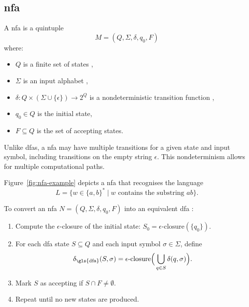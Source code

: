 \subsection{\acrfull{nfa}}
\label{subsec:nfa}
\begin{definition}
    A \gls{nfa} is a quintuple 
    \[
    M = (Q, \Sigma, \delta, q_0, F)
    \]
    where:
    \begin{itemize}
        \item \( Q \) is a finite set of states \cite{kozen1997automata},
        \item \( \Sigma \) is an input alphabet \cite{sudkamp2006languages},
        \item \( \delta: Q \times (\Sigma \cup \{\epsilon\}) \rightarrow 2^Q \) is a nondeterministic transition function \cite{hopcroft2006introduction},
        \item \( q_0 \in Q \) is the initial state,
        \item \( F \subseteq Q \) is the set of accepting states.
    \end{itemize}
\end{definition}

\begin{remark}
Unlike \glspl{dfa}, a \gls{nfa} may have multiple transitions for a given state and input symbol, including transitions on the empty string \(\epsilon\). This nondeterminism allows for multiple computational paths.
\end{remark}

\begin{example}
Figure~\ref{fig:nfa-example} depicts a \gls{nfa} that recognises the language 
\[
L = \{ w \in \{a,b\}^* \mid w \text{ contains the substring } ab \}.
\]
\end{example}

\begin{algorithm}
\label{alg:subset}
To convert an \gls{nfa} \( N = (Q, \Sigma, \delta, q_0, F) \) into an equivalent \gls{dfa} \cite{hopcroft2006introduction, kozen1997automata}:
\begin{enumerate}
    \item Compute the \(\epsilon\)-closure of the initial state: \( S_0 = \epsilon\text{-closure}(\{q_0\}) \).
    \item For each \gls{dfa} state \( S \subseteq Q \) and each input symbol \(\sigma \in \Sigma\), define 
    \[
    \delta_{\text{\gls{dfa}}}(S, \sigma) = \epsilon\text{-closure}\Big(\bigcup_{q \in S} \delta(q, \sigma)\Big).
    \]
    \item Mark \( S \) as accepting if \( S \cap F \neq \emptyset \).
    \item Repeat until no new states are produced.
\end{enumerate}
\end{algorithm}

